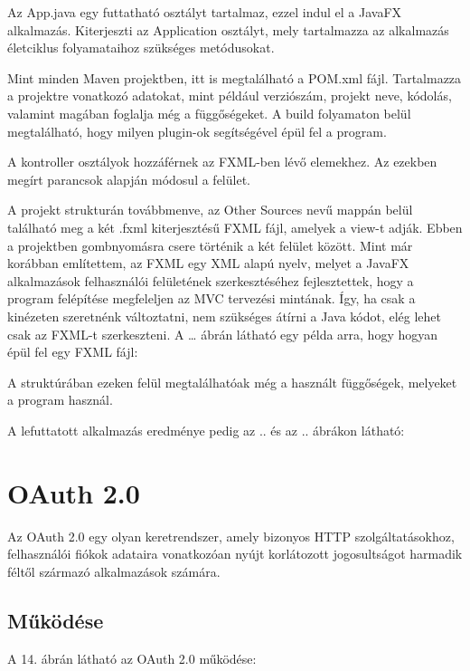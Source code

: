  


Az App.java egy futtatható osztályt tartalmaz, ezzel indul el a JavaFX alkalmazás. Kiterjeszti az Application osztályt, mely tartalmazza az alkalmazás életciklus folyamataihoz szükséges metódusokat. 

Mint minden Maven projektben, itt is megtalálható a POM.xml fájl. Tartalmazza a projektre vonatkozó adatokat, mint például verziószám, projekt neve, kódolás, valamint magában foglalja még a függőségeket. A build folyamaton belül megtalálható, hogy milyen plugin-ok segítségével épül fel a program. 

A kontroller osztályok hozzáférnek az FXML-ben lévő elemekhez. Az ezekben megírt parancsok alapján módosul a felület. 

A projekt strukturán továbbmenve, az Other Sources nevű mappán belül található meg a két .fxml kiterjesztésű FXML fájl, amelyek a view-t adják. Ebben a projektben gombnyomásra csere történik a két felület között. Mint már korábban említettem, az FXML egy XML alapú nyelv, melyet a JavaFX alkalmazások felhasználói felületének szerkesztéséhez fejlesztettek, hogy a program felépítése megfeleljen az MVC tervezési mintának. Így, ha csak a kinézeten szeretnénk változtatni, nem szükséges átírni a Java kódot, elég lehet csak az FXML-t szerkeszteni. A … ábrán látható egy példa arra, hogy hogyan épül fel egy FXML fájl: 



A struktúrában ezeken felül megtalálhatóak még a használt függőségek, melyeket a program használ. 

A lefuttatott alkalmazás eredménye pedig az .. és az .. ábrákon látható: 

\section{OAuth 2.0}

Az OAuth 2.0 egy olyan keretrendszer, amely bizonyos HTTP szolgáltatásokhoz, felhasználói fiókok adataira vonatkozóan nyújt korlátozott jogosultságot harmadik féltől származó alkalmazások számára. 

\subsection*{Működése} 

A 14. ábrán látható az OAuth 2.0 működése: 


